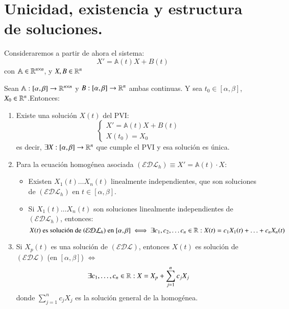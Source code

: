 \section{Unicidad, existencia y estructura de soluciones.}
Consideraremos a partir de ahora el sistema:
$$
    X' = \mathbb{A}(t) X + B(t)
$$
con $\mathbb{A} \in \mathbb{R}^{n\times n}$, y $X, B \in \mathbb{R}^{n}$
\begin{thm}\label{thm:uni-exi-estr}
    Sean $\mathbb{A} : [\alpha, \beta] \to \mathbb{R}^{n\times n}$ y $B : [\alpha, \beta] \to \mathbb{R}^n$ ambas continuas. Y sea $t_0 \in [\alpha, \beta]$, $X_0 \in\mathbb{R}^n$.Entonces:\\
    \begin{enumerate}
        \item Existe una solución $X(t)$ del PVI:
        $$
        \begin{cases}
            X' = \mathbb{A}(t) X + B(t)\\
            X(t_0) = X_0
        \end{cases}
        $$
        es decir, $\exists X : [\alpha, \beta] \to \mathbb{R}^n$ que cumple el PVI y esa solución es única.

        \item Para la ecuación homogénea asociada $(\mathcal{EDL}_h) \equiv X' = \mathbb{A}(t) \cdot X$:
        \begin{itemize}
            \item Existen $X_1(t) \ldots X_n(t)$ linealmente independientes, que son soluciones de $(\mathcal{EDL}_h)$ en $t \in [\alpha, \beta]$.
            \item Si $X_1(t) \ldots X_n(t)$ son soluciones linealmente independientes de $(\mathcal{EDL}_h)$, entonces:
            $$
            X(t) \text{ es solución de } (\mathcal{EDL}_h) \text{ en } [\alpha, \beta] \iff \exists c_1, c_2, \ldots c_n \in \mathbb{R} : X(t) = c_1X_1(t) + \ldots + c_nX_n(t)
            $$
        \end{itemize}
        \item Si $X_p(t)$ es una solución de $(\mathcal{EDL})$, entonces $X(t)$ es solución de $(\mathcal{EDL})$ (en $[\alpha, \beta]$) $\iff$
        $$\exists c_1, \ldots, c_n \in \mathbb{R} : X = X_p + \sum_{j=1}^n c_jX_j$$
        donde $\sum_{j=1}^n c_jX_j$ es la solución general de la homogénea.
    \end{enumerate}
\end{thm}

